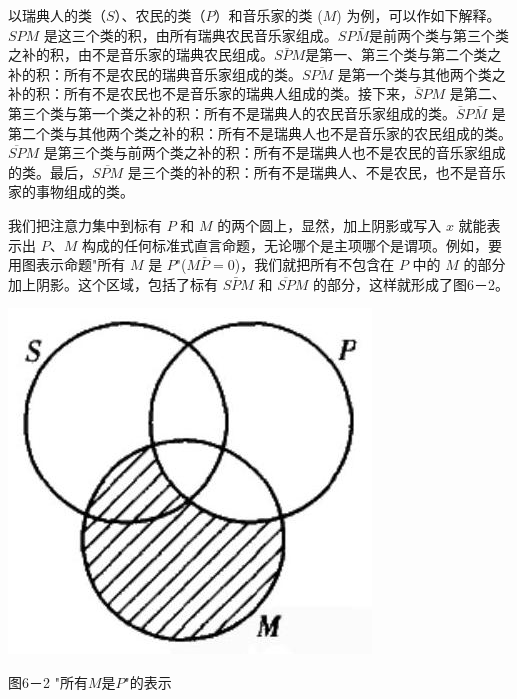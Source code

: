 以瑞典人的类（$S$）、农民的类（$P$）和音乐家的类 ($M$) 为例，可以作如下解释。$SPM$ 是这三个类的积，由所有瑞典农民音乐家组成。$SP\bar{M}$是前两个类与第三个类之补的积，由不是音乐家的瑞典农民组成。$S\bar{P}M$是第一、第三个类与第二个类之补的积：所有不是农民的瑞典音乐家组成的类。$S\overline{PM}$ 是第一个类与其他两个类之补的积：所有不是农民也不是音乐家的瑞典人组成的类。接下来，$\bar{S}PM$ 是第二、第三个类与第一个类之补的积：所有不是瑞典人的农民音乐家组成的类。$\bar{S}P\bar{M}$ 是第二个类与其他两个类之补的积：所有不是瑞典人也不是音乐家的农民组成的类。$\overline{SP}M$ 是第三个类与前两个类之补的积：所有不是瑞典人也不是农民的音乐家组成的类。最后，$\overline{SPM}$ 是三个类的补的积：所有不是瑞典人、不是农民，也不是音乐家的事物组成的类。

我们把注意力集中到标有 $P$ 和 $M$ 的两个圆上，显然，加上阴影或写入 $x$ 就能表示出 $P$、$M$ 构成的任何标准式直言命题，无论哪个是主项哪个是谓项。例如，要用图表示命题"所有 $M$ 是 $P$"($M\bar{P}=0$)，我们就把所有不包含在 $P$ 中的 $M$ 的部分加上阴影。这个区域，包括了标有 $S\bar{P}M$ 和 $\overline{SP}M$ 的部分，这样就形成了图6－2。

\begin{center}
\includegraphics[width=\textwidth]{images/2025_05_15_6a28331d5e7c993ad07ag-275(2).jpg}

图6－2 "所有$M$是$P$"的表示
\end{center}

